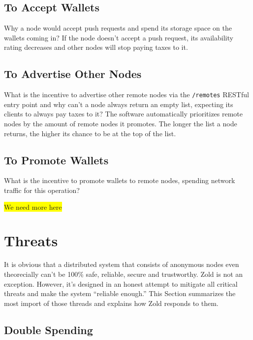 \documentclass[11pt,oneside]{article}
\newcommand\dd[1]{\colorbox{gray!30}{\texttt{#1}}}
\begin{document}
\subsection{To Accept Wallets}

Why a node would accept push requests and spend its storage space
on the wallets coming in? If the node doesn't accept a push request,
its availability rating decreases and other nodes will stop paying
taxes to it.

\subsection{To Advertise Other Nodes}

What is the incentive to advertise other remote nodes via the \dd{/remotes} RESTful
entry point and why can't a node always return an empty list, expecting its clients
to always pay taxes to it? The software automatically prioritizes remote
nodes by the amount of remote nodes it promotes. The longer the list a node
returns, the higher its chance to be at the top of the list.

\subsection{To Promote Wallets}

What is the incentive to promote wallets to remote nodes, spending network
traffic for this operation?

\colorbox{yellow}{We need more here}

\section{Threats}

It is obvious that a distributed system that consists of anonymous nodes
even theorecially can't be 100\% safe, reliable, secure and trustworthy.
Zold is not an exception. However, it's designed in an honest attempt
to mitigate all critical threats and make the system ``reliable enough.''
This Section summarizes the most import of those threads and explains
how Zold responds to them.

\subsection{Double Spending}
\end{document}
